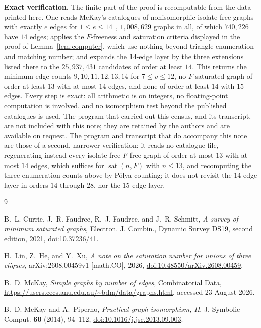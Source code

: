 \documentclass[11pt]{amsart}
\DeclareMathOperator{\sat}{sat}
\begin{document}
\medskip
\noindent\textbf{Exact verification.}
The finite part of the proof is recomputable from the data printed here. One
reads McKay's catalogues of nonisomorphic isolate-free graphs with exactly $e$
edges for $1\le e\le14$~\cite{McKayData}, $1{,}008{,}629$ graphs in all, of
which $740{,}226$ have $14$ edges; applies the $F$-freeness and saturation
criteria displayed in the proof of Lemma~\ref{lem:computer}, which use nothing
beyond triangle enumeration and matching number; and expands the $14$-edge
layer by the three extensions listed there to the $25{,}937{,}431$ candidates
of order at least $14$. This returns the minimum edge counts
$9,10,11,12,13,14$ for $7\le v\le12$, no $F$-saturated graph of order at least
$13$ with at most $14$ edges, and none of order at least $14$ with $15$ edges.
Every step is exact: all arithmetic is on integers, no floating-point
computation is involved, and no isomorphism test beyond the published
catalogues is used. The program that carried out this census, and its
transcript, are not included with this note; they are retained by the authors
and are available on request. The program and transcript that do accompany this
note are those of a second, narrower verification: it reads no catalogue file,
regenerating instead every
isolate-free $F$-free graph of order at most $13$ with at most $14$ edges, which
suffices for $\sat(n,F)$ with $n\le13$, and recomputing the three enumeration
counts above by P\'olya counting; it does not revisit the $14$-edge layer in
orders $14$ through $28$, nor the $15$-edge layer.

\begin{thebibliography}{9}

B.~L. Currie, J.~R. Faudree, R.~J. Faudree, and J.~R. Schmitt,
\emph{A survey of minimum saturated graphs},
Electron. J. Combin., Dynamic Survey DS19, second edition, 2021,
\href{https://doi.org/10.37236/41}{doi:10.37236/41}.

H.~Lin, Z.~He, and Y.~Xu,
\emph{A note on the saturation number for unions of three cliques},
arXiv:2608.00459v1 [math.CO], 2026,
\href{https://doi.org/10.48550/arXiv.2608.00459}
{doi:10.48550/arXiv.2608.00459}.

B.~D. McKay,
\emph{Simple graphs by number of edges}, Combinatorial Data,
\url{https://users.cecs.anu.edu.au/~bdm/data/graphs.html},
accessed 23 August 2026.

B.~D. McKay and A.~Piperno,
\emph{Practical graph isomorphism, II},
J. Symbolic Comput. \textbf{60} (2014), 94--112,
\href{https://doi.org/10.1016/j.jsc.2013.09.003}
{doi:10.1016/j.jsc.2013.09.003}.

\end{thebibliography}
\end{document}
